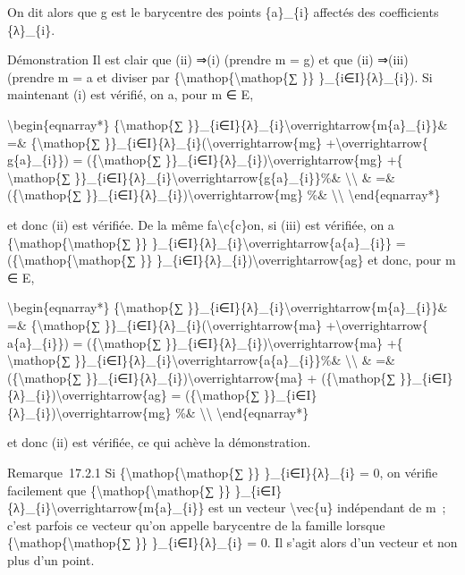 \documentclass[]{article}
\begin{document}
On dit alors que g est le barycentre des points \{a\}\_\{i\} affectés
des coefficients \{λ\}\_\{i\}.

Démonstration Il est clair que (ii) ⇒(i) (prendre m = g) et que (ii)
⇒(iii) (prendre m = a et diviser par
\{\textbackslash{}mathop\{\textbackslash{}mathop\{∑ \}\}
\}\_\{i∈I\}\{λ\}\_\{i\}). Si maintenant (i) est vérifié, on a, pour m ∈
E,

\textbackslash{}begin\{eqnarray*\} \{\textbackslash{}mathop\{∑
\}\}\_\{i∈I\}\{λ\}\_\{i\}\textbackslash{}overrightarrow\{m\{a\}\_\{i\}\}\&
=\& \{\textbackslash{}mathop\{∑
\}\}\_\{i∈I\}\{λ\}\_\{i\}(\textbackslash{}overrightarrow\{mg\}
+\textbackslash{}overrightarrow\{ g\{a\}\_\{i\}\}) =
(\{\textbackslash{}mathop\{∑
\}\}\_\{i∈I\}\{λ\}\_\{i\})\textbackslash{}overrightarrow\{mg\} +\{
\textbackslash{}mathop\{∑
\}\}\_\{i∈I\}\{λ\}\_\{i\}\textbackslash{}overrightarrow\{g\{a\}\_\{i\}\}\%\&
\textbackslash{}\textbackslash{} \& =\& (\{\textbackslash{}mathop\{∑
\}\}\_\{i∈I\}\{λ\}\_\{i\})\textbackslash{}overrightarrow\{mg\} \%\&
\textbackslash{}\textbackslash{} \textbackslash{}end\{eqnarray*\}

et donc (ii) est vérifiée. De la même fa\textbackslash{}c\{c\}on, si
(iii) est vérifiée, on a
\{\textbackslash{}mathop\{\textbackslash{}mathop\{∑ \}\}
\}\_\{i∈I\}\{λ\}\_\{i\}\textbackslash{}overrightarrow\{a\{a\}\_\{i\}\} =
(\{\textbackslash{}mathop\{\textbackslash{}mathop\{∑ \}\}
\}\_\{i∈I\}\{λ\}\_\{i\})\textbackslash{}overrightarrow\{ag\} et donc,
pour m ∈ E,

\textbackslash{}begin\{eqnarray*\} \{\textbackslash{}mathop\{∑
\}\}\_\{i∈I\}\{λ\}\_\{i\}\textbackslash{}overrightarrow\{m\{a\}\_\{i\}\}\&
=\& \{\textbackslash{}mathop\{∑
\}\}\_\{i∈I\}\{λ\}\_\{i\}(\textbackslash{}overrightarrow\{ma\}
+\textbackslash{}overrightarrow\{ a\{a\}\_\{i\}\}) =
(\{\textbackslash{}mathop\{∑
\}\}\_\{i∈I\}\{λ\}\_\{i\})\textbackslash{}overrightarrow\{ma\} +\{
\textbackslash{}mathop\{∑
\}\}\_\{i∈I\}\{λ\}\_\{i\}\textbackslash{}overrightarrow\{a\{a\}\_\{i\}\}\%\&
\textbackslash{}\textbackslash{} \& =\& (\{\textbackslash{}mathop\{∑
\}\}\_\{i∈I\}\{λ\}\_\{i\})\textbackslash{}overrightarrow\{ma\} +
(\{\textbackslash{}mathop\{∑
\}\}\_\{i∈I\}\{λ\}\_\{i\})\textbackslash{}overrightarrow\{ag\} =
(\{\textbackslash{}mathop\{∑
\}\}\_\{i∈I\}\{λ\}\_\{i\})\textbackslash{}overrightarrow\{mg\} \%\&
\textbackslash{}\textbackslash{} \textbackslash{}end\{eqnarray*\}

et donc (ii) est vérifiée, ce qui achève la démonstration.

Remarque~17.2.1 Si \{\textbackslash{}mathop\{\textbackslash{}mathop\{∑
\}\} \}\_\{i∈I\}\{λ\}\_\{i\} = 0, on vérifie facilement que
\{\textbackslash{}mathop\{\textbackslash{}mathop\{∑ \}\}
\}\_\{i∈I\}\{λ\}\_\{i\}\textbackslash{}overrightarrow\{m\{a\}\_\{i\}\}
est un vecteur \textbackslash{}vec\{u\} indépendant de m~; c'est parfois
ce vecteur qu'on appelle barycentre de la famille lorsque
\{\textbackslash{}mathop\{\textbackslash{}mathop\{∑ \}\}
\}\_\{i∈I\}\{λ\}\_\{i\} = 0. Il s'agit alors d'un vecteur et non plus
d'un point.
\end{document}

